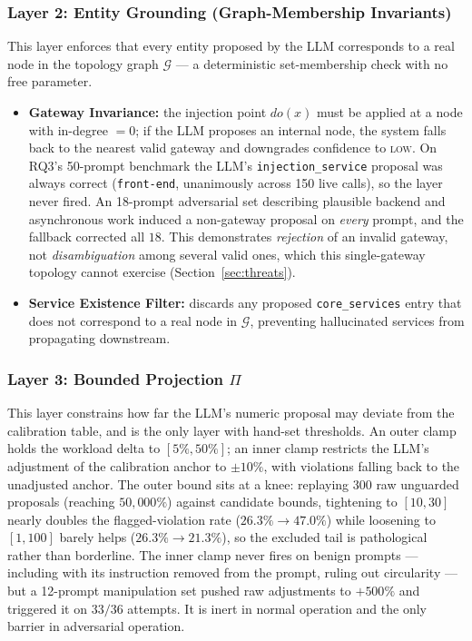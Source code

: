 \documentclass[journal, 10pt]{IEEEtran}
\begin{document}
\subsubsection{Layer 2: Entity Grounding (Graph-Membership Invariants)}
\label{sec:entity-grounding}
This layer enforces that every entity proposed by the LLM corresponds to a real node in the topology graph $\mathcal{G}$ --- a deterministic set-membership check with no free parameter.
\begin{itemize}
    \item \textbf{Gateway Invariance:} the injection point $do(x)$ must be applied at a node with in-degree $= 0$; if the LLM proposes an internal node, the system falls back to the nearest valid gateway and downgrades confidence to \textsc{low}. On RQ3's 50-prompt benchmark the LLM's \texttt{injection\_service} proposal was always correct (\texttt{front-end}, unanimously across 150 live calls), so the layer never fired. An 18-prompt adversarial set describing plausible backend and asynchronous work induced a non-gateway proposal on \emph{every} prompt, and the fallback corrected all $18$. This demonstrates \emph{rejection} of an invalid gateway, not \emph{disambiguation} among several valid ones, which this single-gateway topology cannot exercise (Section~\ref{sec:threats}).
    \item \textbf{Service Existence Filter:} discards any proposed \texttt{core\_services} entry that does not correspond to a real node in $\mathcal{G}$, preventing hallucinated services from propagating downstream.
\end{itemize}

\subsubsection{Layer 3: Bounded Projection $\Pi$}
\label{sec:bounded-projection}
This layer constrains how far the LLM's numeric proposal may deviate from the
calibration table, and is the only layer with hand-set thresholds. An outer clamp
holds the workload delta to $[5\%,50\%]$; an inner clamp restricts the LLM's
adjustment of the calibration anchor to $\pm10\%$, with violations falling back to
the unadjusted anchor. The outer bound sits at a knee: replaying 300 raw
unguarded proposals (reaching $50{,}000\%$) against candidate bounds, tightening
to $[10,30]$ nearly doubles the flagged-violation rate ($26.3\%\to47.0\%$) while
loosening to $[1,100]$ barely helps ($26.3\%\to21.3\%$), so the excluded tail is
pathological rather than borderline. The inner clamp never fires on benign
prompts --- including with its instruction removed from the prompt, ruling out
circularity --- but a 12-prompt manipulation set pushed raw adjustments to
$+500\%$ and triggered it on $33/36$ attempts. It is inert in normal operation
and the only barrier in adversarial operation.
\end{document}
